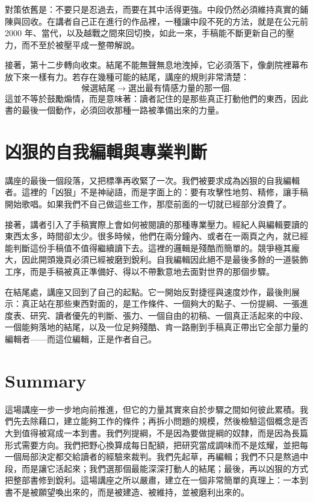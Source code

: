 對策依舊是：不要只是忍過去，而要在其中活得更強。中段仍然必須維持真實的鋪陳與回收。在講者自己正在進行的作品裡，一種讓中段不死的方法，就是在公元前 2000 年、當代，以及越戰之間來回切換，如此一來，手稿能不斷更新自己的壓力，而不至於被壓平成一整帶解說。

接著，第十二步轉向收束。結尾不能無聲無息地洩掉，它必須落下，像劇院裡幕布放下來一樣有力。若存在幾種可能的結尾，講座的規則非常清楚：
\begin{equation}
\text{候選結尾} \to \text{選出最有情感力量的那一個}.
\end{equation}
這並不等於鼓勵煽情，而是意味著：讀者記住的是那些真正打動他們的東西，因此書的最後一個動作，必須回收那種一路被準備出來的力量。

\section{凶狠的自我編輯與專業判斷}

講座的最後一個段落，又把標準再收緊了一次。我們被要求成為凶狠的自我編輯者。這裡的「凶狠」不是神祕語，而是字面上的：要有攻擊性地剪、精修，讓手稿開始歌唱。如果我們不自己做這些工作，那麼前面的一切就已經部分浪費了。

接著，講者引入了手稿實際上會如何被閱讀的那種專業壓力。經紀人與編輯要讀的東西太多，時間卻太少。很多時候，他們在兩分鐘內、或者在一兩頁之內，就已經能判斷這份手稿值不值得繼續讀下去。這裡的邏輯是殘酷而簡單的。競爭極其龐大，因此開頭幾頁必須已經被磨到銳利。自我編輯因此絕不是最後多餘的一道裝飾工序，而是手稿被真正準備好、得以不帶歉意地去面對世界的那個步驟。

在結尾處，講座又回到了自己的起點。它一開始反對捷徑與速度炒作，最後則展示：真正站在那些東西對面的，是工作條件、一個夠大的點子、一份提綱、一張進度表、研究、讀者優先的判斷、張力、一個自由的初稿、一個真正活起來的中段、一個能夠落地的結尾，以及一位足夠殘酷、肯一路刪到手稿真正帶出它全部力量的編輯者——而這位編輯，正是作者自己。

\section{Summary}

這場講座一步一步地向前推進，但它的力量其實來自於步驟之間如何彼此累積。我們先去除藉口，建立能夠工作的條件；再拆小問題的規模，然後檢驗這個概念是否大到值得被寫成一本到書。我們列提綱，不是因為要做提綱的奴隸，而是因為長篇形式需要方向。我們把野心換算成每日配額，把研究當成調味而不是炫耀，並把每一個局部決定都交給讀者的經驗來裁判。我們先起草，再編輯；我們不只是熬過中段，而是讓它活起來；我們選那個最能深深打動人的結尾；最後，再以凶狠的方式把整部書修到銳利。這場講座之所以嚴肅，建立在一個非常簡單的真理上：一本到書不是被願望喚出來的，而是被建造、被維持，並被磨利出來的。